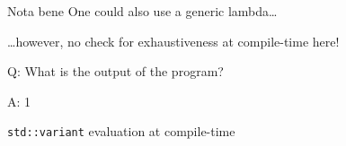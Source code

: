 \begin{frame}{Nota bene}
    One could also use a generic lambda\ldots

    \hfill \ldots however, no check for exhaustiveness at compile-time here!
\end{frame}

\begin{frame}{Q: What is the output of the program?}
\end{frame}

\addtocounter{framenumber}{-1}
\begin{frame}[fragile]{A: 1}
\end{frame}

\begin{frame}[fragile]{\texttt{std::variant} evaluation at compile-time}
\end{frame}
